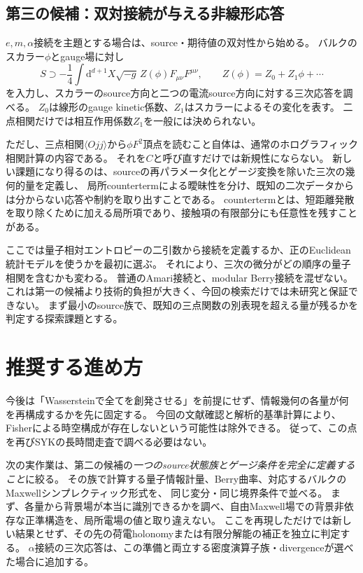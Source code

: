 \documentclass[a4paper,11pt]{ltjsarticle}
\numberwithin{equation}{section}
\newcommand{\dd}{\mathrm d}
\begin{document}
\subsection{第三の候補：双対接続が与える非線形応答}
$e,m,\alpha$接続を主題とする場合は、source・期待値の双対性から始める。
バルクのスカラー$\phi$とgauge場に対し
\begin{equation}
 S\supset-\frac14\int\dd^{d+1}X\sqrt{-g}\,Z(\phi)F_{\mu\nu}F^{\mu\nu},
 \qquad Z(\phi)=Z_0+Z_1\phi+\cdots
 \label{eq:coupling}
\end{equation}
を入力し、スカラーのsource方向と二つの電流source方向に対する三次応答を調べる。
$Z_0$は線形のgauge kinetic係数、$Z_1$はスカラーによるその変化を表す。
二点相関だけでは相互作用係数$Z_1$を一般には決められない。

ただし、三点相関$\langle Ojj\rangle$から$\phi F^2$頂点を読むこと自体は、通常のホログラフィック相関計算の内容である。
それを$C$と呼び直すだけでは新規性にならない。
新しい課題になり得るのは、sourceの再パラメータ化とゲージ変換を除いた三次の幾何的量を定義し、
局所countertermによる曖昧性を分け、既知の二次データからは分からない応答や制約を取り出すことである。
countertermとは、短距離発散を取り除くために加える局所項であり、接触項の有限部分にも任意性を残すことがある。

ここでは量子相対エントロピーの二引数から接続を定義するか、正のEuclidean統計モデルを使うかを最初に選ぶ。
それにより、三次の微分がどの順序の量子相関を含むかも変わる。
普通のAmari接続と、modular Berry接続を混ぜない。
これは第一の候補より技術的負担が大きく、今回の検索だけでは未研究と保証できない。
まず最小のsource族で、既知の三点関数の別表現を超える量が残るかを判定する探索課題とする。

\section{推奨する進め方}
今後は「Wassersteinで全てを創発させる」を前提にせず、情報幾何の各量が何を再構成するかを先に固定する。
今回の文献確認と解析的基準計算により、Fisherによる時空構成が存在しないという可能性は除外できる。
従って、この点を再びSYKの長時間走査で調べる必要はない。

次の実作業は、第二の候補の\emph{一つのsource状態族とゲージ条件を完全に定義すること}に絞る。
その族で計算する量子情報計量、Berry曲率、対応するバルクのMaxwellシンプレクティック形式を、
同じ変分・同じ境界条件で並べる。
まず、各量から背景場が本当に識別できるかを調べ、自由Maxwell場での背景非依存な正準構造を、局所電場の値と取り違えない。
ここを再現しただけでは新しい結果とせず、その先の荷電holonomyまたは有限分解能の補正を独立に判定する。
$\alpha$接続の三次応答は、この準備と両立する密度演算子族・divergenceが選べた場合に追加する。
\end{document}
